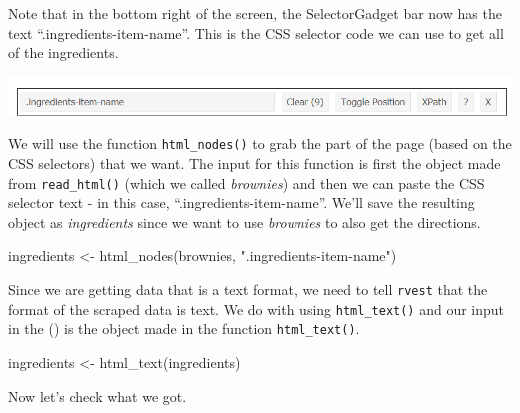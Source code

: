 \documentclass[
  12pt,
]{book}
\newenvironment{Shaded}{\begin{snugshade}}{\end{snugshade}}
\newcommand{\FunctionTok}[1]{\textcolor[rgb]{0,0,0}{#1}}
\newcommand{\NormalTok}[1]{#1}
\newcommand{\OtherTok}[1]{\textcolor[rgb]{0.37,0.37,0.37}{#1}}
\newcommand{\StringTok}[1]{\textcolor[rgb]{0.5,0.5,0.5}{#1}}
\begin{document}
Note that in the bottom right of the screen, the SelectorGadget bar now has the text ``.ingredients-item-name''. This is the CSS selector code we can use to get all of the ingredients.

\includegraphics{images/brownies_4.PNG}

We will use the function \texttt{html\_nodes()} to grab the part of the page (based on the CSS selectors) that we want. The input for this function is first the object made from \texttt{read\_html()} (which we called \emph{brownies}) and then we can paste the CSS selector text - in this case, ``.ingredients-item-name''. We'll save the resulting object as \emph{ingredients} since we want to use \emph{brownies} to also get the directions.

\begin{Shaded}
\begin{Highlighting}[]
\NormalTok{ingredients }\OtherTok{\textless{}{-}} \FunctionTok{html\_nodes}\NormalTok{(brownies, }\StringTok{".ingredients{-}item{-}name"}\NormalTok{)}
\end{Highlighting}
\end{Shaded}

Since we are getting data that is a text format, we need to tell \texttt{rvest} that the format of the scraped data is text. We do with using \texttt{html\_text()} and our input in the () is the object made in the function \texttt{html\_text()}.

\begin{Shaded}
\begin{Highlighting}[]
\NormalTok{ingredients }\OtherTok{\textless{}{-}} \FunctionTok{html\_text}\NormalTok{(ingredients)}
\end{Highlighting}
\end{Shaded}

Now let's check what we got.
\end{document}
